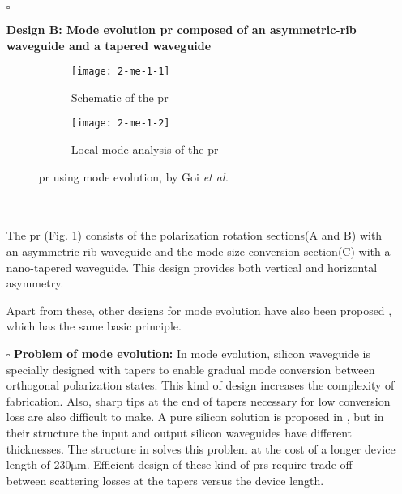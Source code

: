 \documentclass[../report.tex]{subfiles}
\begin{document}
\begin{itemize}[leftmargin=*]
	\item[$\square$] \begin{minipage}[t]{\textwidth}\textbf{Design B: Mode evolution \gls{pr} composed of an asymmetric-rib waveguide and a tapered waveguide}
	\begin{figure}[H] %
		\begin{subfigure}[t]{0.45\textwidth}
			\texttt{[image: 2-me-1-1]}
			\caption{Schematic of the \gls{pr}}
			\label{fig:2_me_1_1}
		\end{subfigure}
		\hfill
		\begin{subfigure}[t]{0.45\textwidth}
			\texttt{[image: 2-me-1-2]}
			\caption{Local mode analysis of the \gls{pr}}
			\label{fig:2_me_1_2}
		\end{subfigure}
		\caption{\gls{pr} using mode evolution, by Goi \textit{et al.} \cite{kazuhiro_integrated_2015}}
	\end{figure}
	\end{minipage}\\\\
	\noindent The \gls{pr} (Fig. \ref{fig:2_me_1_1}) consists of the polarization rotation sections(A and B) with an asymmetric rib waveguide and the mode size conversion section(C) with a nano-tapered waveguide. This design provides both vertical and horizontal asymmetry. \par
	 
	Apart from these, other designs for mode evolution have also been proposed \cite{chen_compact_2011,zhang_efficient_2012,justin_conference_2012}, which has the same basic principle.
	
	\item[$\square$] \textbf{Problem of mode evolution:} In mode evolution, silicon waveguide is specially designed with tapers to enable gradual mode conversion between orthogonal polarization states. This kind of design increases the complexity of fabrication. Also, sharp tips at the end of tapers necessary for low conversion loss are also difficult to make. A pure silicon solution is proposed in \cite{zhang_selected_2010}, but in their structure the input and output silicon waveguides have different thicknesses. The structure in \cite{kazuhiro_integrated_2015} solves this problem at the cost of a longer device length of $230 \si{\micro\meter}$. Efficient design of these kind of \gls{pr}s require trade-off between scattering losses at the tapers versus the device length.
\end{itemize}
\end{document}
